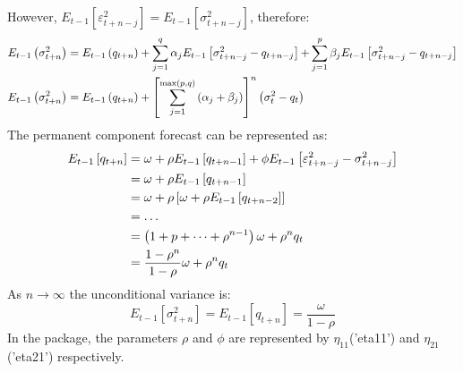 However, ${E_{t - 1}}\left[ {\varepsilon _{t + n - j}^2} \right] = {E_{t - 1}}\left[ {\sigma _{t + n - j}^2} \right]$, therefore:
\begin{equation}
\begin{gathered}
  {E_{t - 1}}\left( {\sigma _{t + n}^2} \right) = {E_{t - 1}}\left( {{q_{t + n}}} \right) + \sum\limits_{j = 1}^q {{\alpha _j}{E_{t - 1}}\left[ {\sigma _{t + n - j}^2 - {q_{t + n - j}}} \right] + } \sum\limits_{j = 1}^p {{\beta _j}{E_{t - 1}}\left[ {\sigma _{t + n - j}^2 - {q_{t + n - j}}} \right]}  \hfill \\
  {E_{t - 1}}\left( {\sigma _{t + n}^2} \right) = {E_{t - 1}}\left( {{q_{t + n}}} \right) + {\left[ {\sum\limits_{j = 1}^{\max (p,q)} {\left( {{\alpha _j} + {\beta _j}} \right)} } \right]^n}\left( {\sigma _t^2 - {q_t}} \right) \hfill \\
\end{gathered}
\end{equation}
The permanent component forecast can be represented as:
\begin{align}
  {E_{t - 1}}\left[ {{q_{t + n}}} \right] & = \omega  + \rho {E_{t - 1}}\left[ {{q_{t + n - 1}}} \right] + \phi {E_{t - 1}}\left[ {\varepsilon _{t + n - j}^2 - \sigma _{t + n - j}^2} \right] \hfill \\
   & = \omega  + \rho {E_{t - 1}}\left[ {{q_{t + n - 1}}} \right]\hfill \\
   & = \omega  + \rho \left[ {\omega  + \rho {E_{t - 1}}\left[ {{q_{t + n - 2}}} \right]} \right] \hfill \\
   & = \dots \hfill \\
   & = \left( {1 + p + \dots + {\rho ^{n - 1}}} \right)\omega  + {\rho ^n}{q_t} \hfill \\
   & = \frac{{1 - {\rho ^n}}}{{1 - \rho }}\omega  + {\rho ^n}{q_t} \hfill \\
\end{align}
As $n \to \infty$ the unconditional variance is:
\begin{equation}
{E_{t - 1}}\left[ {\sigma _{t + n}^2} \right] = {E_{t - 1}}\left[ {{q_{t + n}}} \right] = \frac{\omega }{{1 - \rho }}
\end{equation}
In the \verb@rugarch@ package, the parameters $\rho$ and $\phi$ are
represented by $\eta_{11}$('eta11') and $\eta_{21}$('eta21') respectively.
